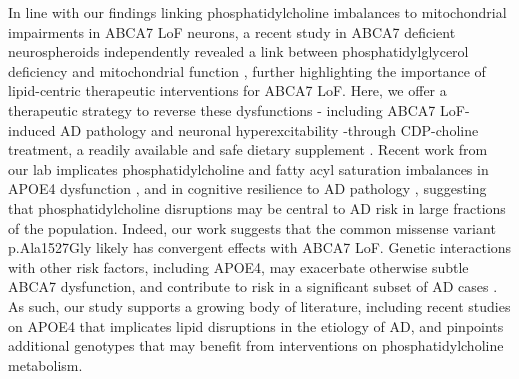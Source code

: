 In line with our findings linking phosphatidylcholine imbalances to mitochondrial impairments in ABCA7 LoF neurons, a recent study in ABCA7 deficient neurospheroids independently revealed a link between phosphatidylglycerol deficiency and mitochondrial function \cite{Kawatani2023-vf}, further highlighting the importance of lipid-centric therapeutic interventions for ABCA7 LoF. Here, we offer a therapeutic strategy to reverse these dysfunctions - including ABCA7 LoF-induced AD pathology and neuronal hyperexcitability -through CDP-choline treatment, a readily available and safe dietary supplement \cite{Gavrilova2018-oi,Zeisel2009-xv,Blusztajn2017-nv}.  Recent work from our lab implicates phosphatidylcholine and fatty acyl saturation imbalances in APOE4 dysfunction \cite{Sienski2021-zt}, and in cognitive resilience to AD pathology \cite{Mathys2024-ex}, suggesting that phosphatidylcholine disruptions may be central to AD risk in large fractions of the population. Indeed, our work suggests that the common missense variant p.Ala1527Gly likely has convergent effects with ABCA7 LoF. Genetic interactions with other risk factors, including APOE4, may exacerbate otherwise subtle ABCA7 dysfunction, and contribute to risk in a significant subset of AD cases \cite{Wang2021-oa,Hemani2013-zr,Haig2011-vs,Zuk2012-uz}. As such, our study supports a growing body of literature, including recent studies on APOE4 \cite{Haney2024-fx,Victor2022-tl} that implicates lipid disruptions in the etiology of AD, and pinpoints additional genotypes that may benefit from interventions on phosphatidylcholine metabolism.



